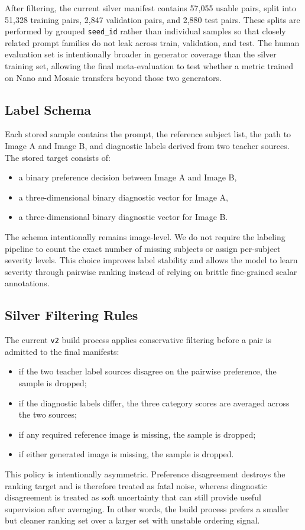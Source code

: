After filtering, the current silver manifest contains 57,055 usable pairs, split into 51,328 training pairs, 2,847 validation pairs, and 2,880 test pairs. These splits are performed by grouped \texttt{seed\_id} rather than individual samples so that closely related prompt families do not leak across train, validation, and test. The human evaluation set is intentionally broader in generator coverage than the silver training set, allowing the final meta-evaluation to test whether a metric trained on Nano and Mosaic transfers beyond those two generators.

\subsection{Label Schema}
Each stored sample contains the prompt, the reference subject list, the path to Image A and Image B, and diagnostic labels derived from two teacher sources. The stored target consists of:
\begin{itemize}
    \item a binary preference decision between Image A and Image B,
    \item a three-dimensional binary diagnostic vector for Image A,
    \item a three-dimensional binary diagnostic vector for Image B.
\end{itemize}

The schema intentionally remains image-level. We do not require the labeling pipeline to count the exact number of missing subjects or assign per-subject severity levels. This choice improves label stability and allows the model to learn severity through pairwise ranking instead of relying on brittle fine-grained scalar annotations.

\subsection{Silver Filtering Rules}
The current \texttt{v2} build process applies conservative filtering before a pair is admitted to the final manifests:
\begin{itemize}
    \item if the two teacher label sources disagree on the pairwise preference, the sample is dropped;
    \item if the diagnostic labels differ, the three category scores are averaged across the two sources;
    \item if any required reference image is missing, the sample is dropped;
    \item if either generated image is missing, the sample is dropped.
\end{itemize}
This policy is intentionally asymmetric. Preference disagreement destroys the ranking target and is therefore treated as fatal noise, whereas diagnostic disagreement is treated as soft uncertainty that can still provide useful supervision after averaging. In other words, the build process prefers a smaller but cleaner ranking set over a larger set with unstable ordering signal.

